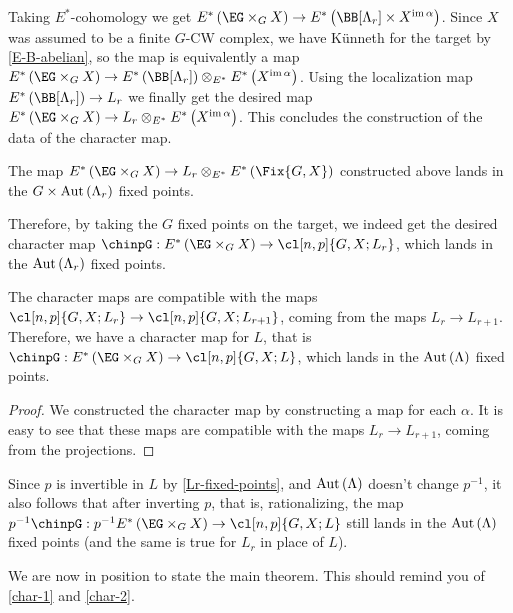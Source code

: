Taking $E^*$-cohomology we get $E^*\left(\EG \times_G X\right) \to E^*\left(\BB[\Lambda_r] \times X^{\im \alpha}\right)$.
Since $X$ was assumed to be a finite $G$-CW complex, we have K\"unneth for the target by \cref{E-B-abelian}, so the map is equivalently a map $E^*\left(\EG \times_G X\right) \to E^*\left(\BB[\Lambda_r]\right) \otimes_{E^*} E^*\left(X^{\im \alpha}\right)$.
Using the localization map $E^*\left(\BB[\Lambda_r]\right) \to L_r$ we finally get the desired map $E^*\left(\EG \times_G X\right) \to L_r \otimes_{E^*} E^*\left(X^{\im \alpha}\right)$.
This concludes the construction of the data of the character map.

\begin{proposition}
	The map $E^*\left(\EG \times_G X\right) \to L_r \otimes_{E^*} E^*\left(\Fix{G,X}\right)$ constructed above lands in the $G \times \operatorname{Aut} \left(\Lambda_r\right)$ fixed points.
\end{proposition}

Therefore, by taking the $G$ fixed points on the target, we indeed get the desired character map $\chinpG: E^*\left(\EG \times_G X\right) \to \cl[n,p]{G,X; L_r}$, which lands in the $\operatorname{Aut} \left(\Lambda_r\right)$ fixed points.

\begin{proposition}
	The character maps are compatible with the maps $\cl[n,p]{G,X; L_r} \to \cl[n,p]{G,X; L_{r+1}}$, coming from the maps $L_r \to L_{r+1}$.
	Therefore, we have a character map for $L$, that is $\chinpG: E^*\left(\EG \times_G X\right) \to \cl[n,p]{G,X; L}$, which lands in the $\operatorname{Aut} \left(\Lambda\right)$ fixed points.
\end{proposition}

\begin{proof}
	We constructed the character map by constructing a map for each $\alpha$.
	It is easy to see that these maps are compatible with the maps $L_r \to L_{r+1}$, coming from the projections.
\end{proof}

Since $p$ is invertible in $L$ by \cref{Lr-fixed-points}, and $\operatorname{Aut} \left(\Lambda\right)$ doesn't change $p^{-1}$, it also follows that after inverting $p$, that is, rationalizing, the map $p^{-1} \chinpG: p^{-1} E^*\left(\EG \times_G X\right) \to \cl[n,p]{G,X; L}$ still lands in the $\operatorname{Aut} \left(\Lambda\right)$ fixed points (and the same is true for $L_r$ in place of $L$).

We are now in position to state the main theorem.
This should remind you of \cref{char-1} and \cref{char-2}.

